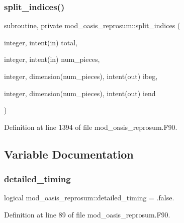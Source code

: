 \subsubsection{\texorpdfstring{split\+\_\+indices()}{split\_indices()}}
{\footnotesize\ttfamily subroutine, private mod\+\_\+oasis\+\_\+reprosum\+::split\+\_\+indices (\begin{DoxyParamCaption}\item[{integer, intent(in)}]{total,  }\item[{integer, intent(in)}]{num\+\_\+pieces,  }\item[{integer, dimension(num\+\_\+pieces), intent(out)}]{ibeg,  }\item[{integer, dimension(num\+\_\+pieces), intent(out)}]{iend }\end{DoxyParamCaption})\hspace{0.3cm}{\ttfamily [private]}}



Definition at line 1394 of file mod\+\_\+oasis\+\_\+reprosum.\+F90.



\subsection{Variable Documentation}
\mbox{\label{namespacemod__oasis__reprosum_a48a084c213295b9eaa78c0552a10741a}} 
\subsubsection{\texorpdfstring{detailed\+\_\+timing}{detailed\_timing}}
{\footnotesize\ttfamily logical mod\+\_\+oasis\+\_\+reprosum\+::detailed\+\_\+timing = .false.\hspace{0.3cm}{\ttfamily [private]}}



Definition at line 89 of file mod\+\_\+oasis\+\_\+reprosum.\+F90.

\mbox{\label{namespacemod__oasis__reprosum_a89140c250e34a903bc9aa546574988d6}} 
